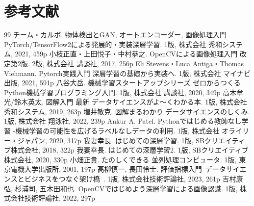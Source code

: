 \documentclass[dvipdfmx]{jsarticle}
\begin{document}
\section{参考文献}
\begin{thebibliography}{99}
     チーム・カルボ. 物体検出とGAN, オートエンコーダー, 画像処理入門 PyTorch/TensorFlow2による発展的・実装深層学習. 1版, 株式会社 秀和システム, 2021, 459p
     小枝正直・上田悦子・中村恭之. OpenCVによる画像処理入門 改定第2版. 2版, 株式会社 講談社, 2017, 256p
     Eli Stevens・Luca Antiga・Thomas Viehmann. Pytorch実践入門 深層学習の基礎から実装へ. 1版, 株式会社 マイナビ出版, 2021, 591p
     八谷大岳. 機械学習スタートアップシリーズ ゼロからつくるPython機械学習プログラミング入門. 1版, 株式会社 講談社, 2020, 349p
     高木章光/鈴木英太. 図解入門 最新 データサイエンスがよ～くわかる本. 1版, 株式会社 秀和システム, 2019, 263p
     増井敏克. 図解まるわかり データサイエンスのしくみ. 1版, 株式会社 翔泳社, 2022, 239p
     Ankur A. Patel. Pythonではじめる教師なし学習 -機械学習の可能性を広げるラベルなしデータの利用. 1版, 株式会社 オライリー・ジャパン, 2020, 317p
     我妻幸長. はじめての深層学習. 1版, SBクリエイティブ株式会社, 2018, 322p
     我妻幸長. はじめての深層学習2. 1版, SBクリエイティブ株式会社, 2020, 330p
     小畑正貴. たのしくできる 並列処理コンピュータ. 1版, 東京電機大学出版所, 2001, 197p
     高柳慎一, 長田怜士. 評価指標入門~データサイエンスとビジネスをつなぐ架け橋~. 1版, 株式会社技術評論社, 2023, 261p
     吉村康弘, 杉浦司, 五木田和也. OpenCVではじめよう深層学習による画像認識. 1版, 株式会社技術評論社, 2022, 297p


\end{thebibliography}
\end{document}
